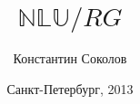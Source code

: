 \documentclass{beamer}
\begin{document}
\title{\huge{$\mathbb{NLU}/RG$}}
\author{Константин Соколов}
\date{Санкт-Петербург, 2013} 
\begin{frame}
\thispagestyle{empty}
\titlepage
\end{frame}

\end{document}
